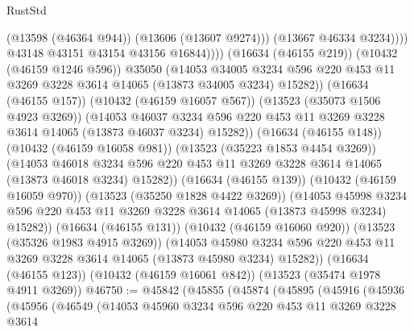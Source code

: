 \begin{lexlean}{RustStd}
\begin{coremodule}
                              (@13598 (@46364 @944))
                              (@13606 (@13607 @9274)))
                            (@13667 @46334 @3234))))
                      @43148
                      @43151
                      @43154
                      @43156
                      @16844))))
              (@16634 (@46155 @219))
              (@10432 (@46159 @1246 @596))
              @35050
              (@14053
                @34005
                @3234
                @596
                @220
                @453
                @11
                @3269
                @3228
                @3614
                @14065
                (@13873 @34005 @3234)
                @15282))
            (@16634 (@46155 @157))
            (@10432 (@46159 @16057 @567))
            (@13523 (@35073 @1506 @4923 @3269))
            (@14053
              @46037
              @3234
              @596
              @220
              @453
              @11
              @3269
              @3228
              @3614
              @14065
              (@13873 @46037 @3234)
              @15282))
          (@16634 (@46155 @148))
          (@10432 (@46159 @16058 @981))
          (@13523 (@35223 @1853 @4454 @3269))
          (@14053
            @46018
            @3234
            @596
            @220
            @453
            @11
            @3269
            @3228
            @3614
            @14065
            (@13873 @46018 @3234)
            @15282))
        (@16634 (@46155 @139))
        (@10432 (@46159 @16059 @970))
        (@13523 (@35250 @1828 @4422 @3269))
        (@14053
          @45998
          @3234
          @596
          @220
          @453
          @11
          @3269
          @3228
          @3614
          @14065
          (@13873 @45998 @3234)
          @15282))
      (@16634 (@46155 @131))
      (@10432 (@46159 @16060 @920))
      (@13523 (@35326 @1983 @4915 @3269))
      (@14053
        @45980
        @3234
        @596
        @220
        @453
        @11
        @3269
        @3228
        @3614
        @14065
        (@13873 @45980 @3234)
        @15282))
    (@16634 (@46155 @123))
    (@10432 (@46159 @16061 @842))
    (@13523 (@35474 @1978 @4911 @3269))
@46750 := @45842
    (@45855
      (@45874
        (@45895
          (@45916
            (@45936
              (@45956
                (@46549
                  (@14053
                    @45960
                    @3234
                    @596
                    @220
                    @453
                    @11
                    @3269
                    @3228
                    @3614

\end{coremodule}
\end{lexlean}
